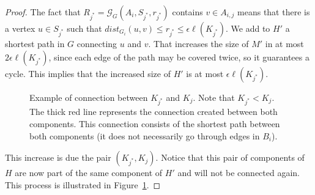 \begin{proof}
The fact that \(R_{j^\ast} = \mathcal{G}_G(A_i, S_{j^\ast}, r_{j^\ast})\) contains \(v \in A_{i, j}\) means that there is a vertex \(u \in S_{j^\ast}\) such that \(dist_{G_i}(u, v) \leq r_{j^\ast} \leq \epsilon \ell(K_{j^\ast})\). We add to \(H'\) a shortest path in \(G\) connecting \(u\) and \(v\). That increases the size of \(M'\) in at most \(2 \epsilon \ell(K_{j^\ast})\), since each edge of the path may be covered twice, so it guarantees a cycle. This implies that the increased size of \(H'\) is at most \(\epsilon \ell(K_{j^\ast})\).


\begin{figure}[H]
    \centering
{}
    \caption{Example of connection between \(K_{j^\ast}\) and \(K_j\). Note that \(K_{j^\ast} < K_j\). The thick red line represents the connection created between both components. This connection consists of the shortest path between both components (it does not necessarily go through edges in \(B_i\)).}
    \label{fig:connect_k_j_ast_and_k_j}
\end{figure}


This increase is due the pair \((K_{j^\ast}, K_j)\). Notice that this pair of components of \(H\) are now part of the same component of \(H'\) and will not be connected again. This process is illustrated in Figure~\ref{fig:connect_k_j_ast_and_k_j}.


\end{proof}
